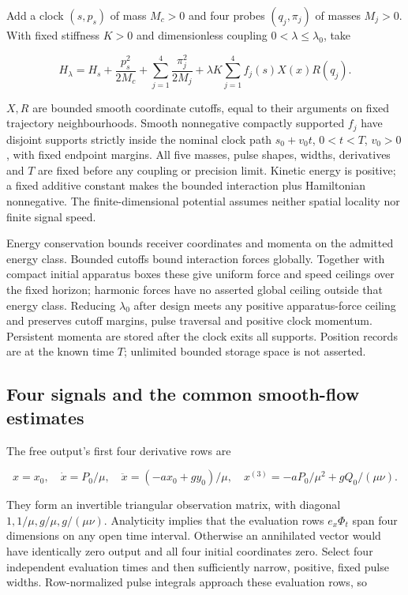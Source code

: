 \documentclass[11pt,a4paper]{article}
\begin{document}
Add a clock \((s,p_s)\) of mass \(M_c>0\) and four probes
\((q_j,\pi_j)\) of masses \(M_j>0\). With fixed stiffness \(K>0\) and
dimensionless coupling \(0<\lambda\le\lambda_0\), take

\[H_\lambda=H_s+\frac{p_s^2}{2M_c}+\sum_{j=1}^4\frac{\pi_j^2}{2M_j}
 +\lambda K\sum_{j=1}^4 f_j(s)X(x)R(q_j).\]

\(X,R\) are bounded smooth coordinate cutoffs, equal to their arguments
on fixed trajectory neighbourhoods. Smooth nonnegative compactly
supported \(f_j\) have disjoint supports strictly inside the nominal
clock path \(s_0+v_0t\), \(0<t<T\), \(v_0>0\), with fixed endpoint
margins. All five masses, pulse shapes, widths, derivatives and \(T\)
are fixed before any coupling or precision limit. Kinetic energy is
positive; a fixed additive constant makes the bounded interaction plus
Hamiltonian nonnegative. The finite-dimensional potential assumes
neither spatial locality nor finite signal speed.

Energy conservation bounds receiver coordinates and momenta on the
admitted energy class. Bounded cutoffs bound interaction forces
globally. Together with compact initial apparatus boxes these give
uniform force and speed ceilings over the fixed horizon; harmonic forces
have no asserted global ceiling outside that energy class. Reducing
\(\lambda_0\) after design meets any positive apparatus-force ceiling
and preserves cutoff margins, pulse traversal and positive clock
momentum. Persistent momenta are stored after the clock exits all
supports. Position records are at the known time \(T\); unlimited
bounded storage space is not asserted.

\hypertarget{four-signals-and-the-common-smooth-flow-estimates}{%
\subsection{Four signals and the common smooth-flow
estimates}\label{four-signals-and-the-common-smooth-flow-estimates}}

The free output's first four derivative rows are

\[x=x_0,\quad \dot x=P_0/\mu,\quad
\ddot x=(-ax_0+gy_0)/\mu,\quad
x^{(3)}=-aP_0/\mu^2+gQ_0/(\mu\nu).\]

They form an invertible triangular observation matrix, with diagonal
\(1,1/\mu,g/\mu,g/(\mu\nu)\). Analyticity implies that the evaluation
rows \(e_x\Phi_t\) span four dimensions on any open time interval.
Otherwise an annihilated vector would have identically zero output and
all four initial coordinates zero. Select four independent evaluation
times and then sufficiently narrow, positive, fixed pulse widths.
Row-normalized pulse integrals approach these evaluation rows, so
\end{document}
